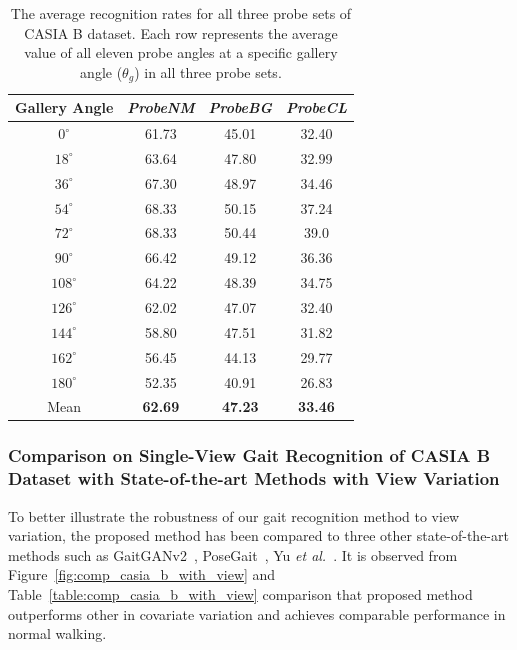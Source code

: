 \begin{table}[t]
	\centering
	\caption{The average recognition rates for all three probe sets of CASIA B dataset. Each row represents the average value of all eleven probe angles at a specific gallery angle ($ \theta_g $) in all three probe sets. \label{table:result_casia_b_with_view}}
	{\begin{tabular*}{22pc}{cccc}\hline
			Gallery Angle &\textit{ProbeNM} &\textit{ProbeBG} &\textit{ProbeCL} \\\hline\noalign{\smallskip}
			${0^{\circ}}$	&61.73  &45.01  &32.40 \\\noalign{\smallskip}
			${18^{\circ}}$  &63.64  &47.80  &32.99 \\\noalign{\smallskip}
			${36^{\circ}}$	&67.30  &48.97  &34.46 \\\noalign{\smallskip}
			${54^{\circ}}$	&68.33  &50.15  &37.24 \\\noalign{\smallskip}
			${72^{\circ}}$	&68.33  &50.44  &39.0  \\\noalign{\smallskip}
			${90^{\circ}}$	&66.42  &49.12  &36.36  \\\noalign{\smallskip}
			${108^{\circ}}$ &64.22  &48.39  &34.75  \\\noalign{\smallskip}
			${126^{\circ}}$ &62.02  &47.07  &32.40  \\\noalign{\smallskip}
			${144^{\circ}}$ &58.80  &47.51  &31.82  \\\noalign{\smallskip}
			${162^{\circ}}$	&56.45  &44.13  &29.77  \\\noalign{\smallskip}
			${180^{\circ}}$ &52.35  &40.91  &26.83  \\\noalign{\smallskip}
			Mean &\textbf{62.69}  &\textbf{47.23} &\textbf{33.46} \\\hline
			
	\end{tabular*}}{}
\end{table}



\subsubsection{Comparison on Single-View Gait Recognition of CASIA B Dataset with State-of-the-art Methods with View Variation}
To better illustrate the robustness of our gait recognition method to view variation, the proposed method has been compared to three other state-of-the-art methods such as GaitGANv2~\cite{Yu_19}, PoseGait~\cite{Liao_19}, Yu \textit{et al.}~\cite{Yu_17_spae}.  It is observed from Figure~\ref{fig:comp_casia_b_with_view} and Table~\ref{table:comp_casia_b_with_view} comparison that proposed method outperforms other in covariate variation and achieves comparable performance in normal walking. 

